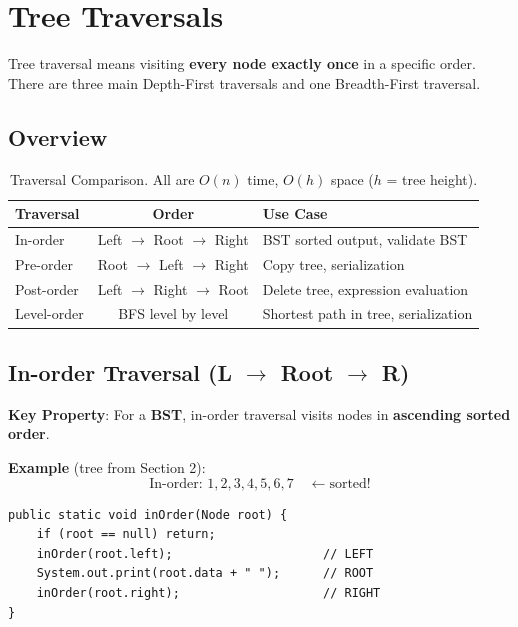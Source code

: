 \documentclass[12pt,a4paper]{article}
\begin{document}
\newpage

\section{Tree Traversals}

Tree traversal means visiting \textbf{every node exactly once} in a specific order. There are three main Depth-First traversals and one Breadth-First traversal.

\subsection{Overview}

\begin{table}[h!]
\centering
\renewcommand{\arraystretch}{1.4}
\begin{tabular}{|l|c|l|}
\hline
\textbf{Traversal} & \textbf{Order} & \textbf{Use Case} \\
\hline
In-order    & Left $\to$ Root $\to$ Right  & BST sorted output, validate BST \\
Pre-order   & Root $\to$ Left $\to$ Right  & Copy tree, serialization \\
Post-order  & Left $\to$ Right $\to$ Root  & Delete tree, expression evaluation \\
Level-order & BFS level by level           & Shortest path in tree, serialization \\
\hline
\end{tabular}
\caption{Traversal Comparison. All are $O(n)$ time, $O(h)$ space ($h$ = tree height).}
\end{table}

\subsection{In-order Traversal (L $\to$ Root $\to$ R)}

\textbf{Key Property}: For a \textbf{BST}, in-order traversal visits nodes in \textbf{ascending sorted order}.

\textbf{Example} (tree from Section 2):
\[
\text{In-order: } 1, 2, 3, 4, 5, 6, 7 \quad \leftarrow \text{sorted!}
\]

\begin{lstlisting}[style=javastyle, caption={In-order Traversal — Java}]
public static void inOrder(Node root) {
    if (root == null) return;
    inOrder(root.left);                     // LEFT
    System.out.print(root.data + " ");      // ROOT
    inOrder(root.right);                    // RIGHT
}
\end{lstlisting}
\end{document}
